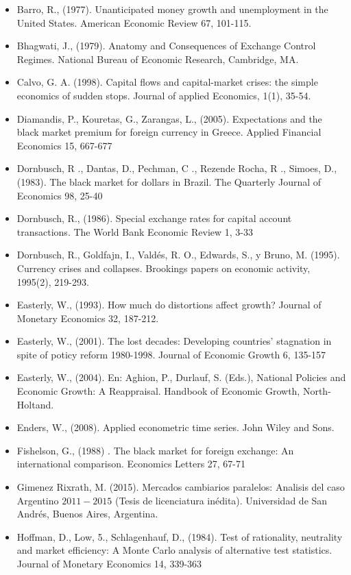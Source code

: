 \documentclass[11pt,a4paper]{article}
\begin{document}
\begin{itemize}
\item Barro, R., (1977). Unanticipated money growth and unemployment in the United States. American Economic Review 67, 101-115.
\item Bhagwati, J., (1979). Anatomy and Consequences of Exchange Control Regimes. National Bureau of Economic Research, Cambridge, MA.
\item Calvo, G. A. (1998). Capital flows and capital-market crises: the simple economics of sudden stops. Journal of applied Economics, 1(1), 35-54.
\item Diamandis, P., Kouretas, G., Zarangas, L., (2005). Expectations and the black market premium for foreign currency in Greece. Applied Financial Economics 15, 667-677
\item Dornbusch, R ., Dantas, D., Pechman, C ., Rezende Rocha, R ., Simoes, D., (1983). The black market for dollars in Brazil. The Quarterly Journal of Economics 98, 25-40
\item Dornbusch, R., (1986). Special exchange rates for capital account transactions. The World Bank Economic Review 1, 3-33
\item Dornbusch, R., Goldfajn, I., Valdés, R. O., Edwards, S., y Bruno, M. (1995). Currency crises and collapses. Brookings papers on economic activity, 1995(2), 219-293.
\item Easterly, W., (1993). How much do distortions affect growth? Journal of Monetary Economics 32, 187-212.
\item Easterly, W., (2001). The lost decades: Developing countries' stagnation in spite of poticy reform 1980-1998. Journal of Economic Growth 6, 135-157
\item Easterly, W., (2004). En: Aghion, P., Durlauf, S. (Eds.), National Policies and Economic Growth: A Reappraisal. Handbook of Economic Growth, North-Holtand.
\item Enders, W., (2008). Applied econometric time series. John Wiley and Sons.
\item Fishelson, G., (1988) . The black market for foreign exchange: An international comparison. Economics Letters 27, 67-71
\item Gimenez Rixrath, M. (2015). Mercados cambiarios paralelos: Analisis del caso Argentino $2011-2015$ (Tesis de licenciatura inédita). Universidad de San Andrés, Buenos Aires, Argentina.
\item Hoffman, D., Low, 5., Schlagenhauf, D., (1984). Test of rationality, neutrality and market efficiency: A Monte Carlo analysis of alternative test statistics. Journal of Monetary Economics 14, 339-363

\end{itemize}
\end{document}
